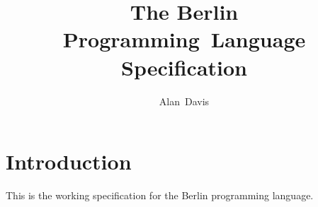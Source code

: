 \documentclass[a4paper, 12pt, notitlepage]{report}
\title{The Berlin Programming~Language Specification}
\author{Alan~Davis}
\begin{document}
\maketitle

\tableofcontents

\chapter{Introduction}
This is the working specification for the Berlin programming language.
\end{document}
